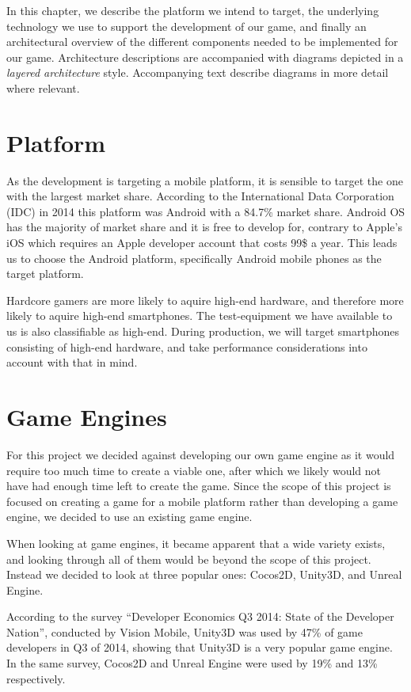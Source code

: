 In this chapter, we describe the platform we intend to target, the underlying
technology we use to support the development of our game, and finally an
architectural overview of the different components needed to be implemented for
our game. Architecture descriptions are accompanied with diagrams depicted in a
\textit{layered architecture} style. Accompanying text describe diagrams in
more detail where relevant.

\section{Platform}
As the development is targeting a mobile platform, it is sensible to target the one with the largest market share.
According to the International Data Corporation (IDC) in 2014 this platform was Android with a 84.7\% market share\cite{marketshare}.
Android OS has the majority of market share and it is free to develop
for, contrary to Apple's iOS which requires an Apple developer account that
costs 99\$ a year\cite{appledevprogram}.
This leads us to choose the Android platform, specifically Android mobile
phones as the target platform.

Hardcore gamers are more likely to aquire high-end hardware, and therefore more likely to aquire high-end smartphones.
The test-equipment we have available to us is also classifiable as high-end.
During production, we will target smartphones consisting of high-end hardware, and take performance considerations into account with that in mind.

\section{Game Engines}
For this project we decided against developing our own game engine as it would require too much time to create a viable one, after which we likely would not have had enough time left to create the game. 
Since the scope of this project is focused on creating a game for a mobile platform rather than developing a game engine, we decided to use an existing game engine.

When looking at game engines, it became apparent that a wide variety exists, and looking through all of them would be beyond the scope of this project.
Instead we decided to look at three popular ones: Cocos2D, Unity3D, and Unreal Engine.

According to the survey ``Developer Economics Q3 2014: State of the Developer Nation''\cite{visionmobile-survey}, conducted by Vision Mobile\cite{visionmobile}, Unity3D was used by 47\% of game developers in Q3 of 2014, showing that Unity3D is a very popular game engine. 
In the same survey, Cocos2D and Unreal Engine were used by 19\% and 13\% respectively.

